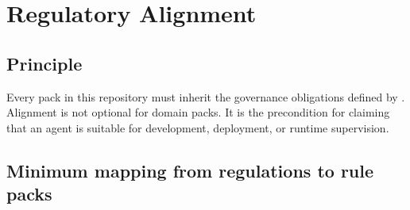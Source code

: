 \chapter{Regulatory Alignment}
\label{ch:reg-alignment}

\section{Principle}

Every  pack in this repository must inherit the
governance obligations defined by
. Alignment is not
optional for domain packs. It is the precondition for claiming that an
agent is suitable for development, deployment, or runtime supervision.

\section{Minimum mapping from regulations to rule packs}

